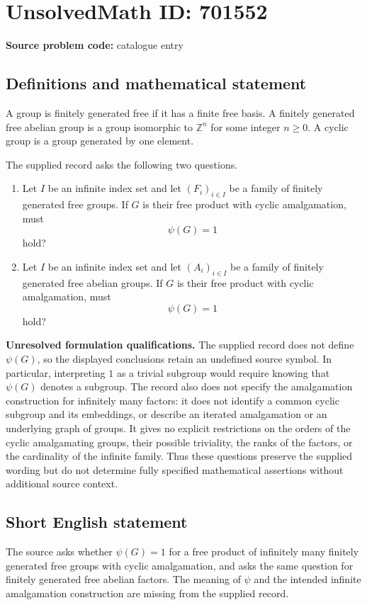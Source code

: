 \documentclass[11pt]{article}
\newcommand{\Z}{\mathbb{Z}}
\begin{document}
\section*{UnsolvedMath ID: 701552}
\textbf{Source problem code:} catalogue entry
\subsection{Definitions and mathematical statement}
A group is finitely generated free if it has a finite free basis. A finitely generated free abelian group is a group isomorphic to \(\Z^n\) for some integer \(n\geq 0\). A cyclic group is a group generated by one element.

The supplied record asks the following two questions.
\begin{enumerate}
\item[(a)] Let \(I\) be an infinite index set and let \((F_i)_{i\in I}\) be a family of finitely generated free groups. If \(G\) is their free product with cyclic amalgamation, must
\[
\psi(G)=1
\]
hold?
\item[(b)] Let \(I\) be an infinite index set and let \((A_i)_{i\in I}\) be a family of finitely generated free abelian groups. If \(G\) is their free product with cyclic amalgamation, must
\[
\psi(G)=1
\]
hold?
\end{enumerate}

\textbf{Unresolved formulation qualifications.} The supplied record does not define \(\psi(G)\), so the displayed conclusions retain an undefined source symbol. In particular, interpreting \(1\) as a trivial subgroup would require knowing that \(\psi(G)\) denotes a subgroup. The record also does not specify the amalgamation construction for infinitely many factors: it does not identify a common cyclic subgroup and its embeddings, or describe an iterated amalgamation or an underlying graph of groups. It gives no explicit restrictions on the orders of the cyclic amalgamating groups, their possible triviality, the ranks of the factors, or the cardinality of the infinite family. Thus these questions preserve the supplied wording but do not determine fully specified mathematical assertions without additional source context.
\subsection{Short English statement}
The source asks whether \(\psi(G)=1\) for a free product of infinitely many finitely generated free groups with cyclic amalgamation, and asks the same question for finitely generated free abelian factors. The meaning of \(\psi\) and the intended infinite amalgamation construction are missing from the supplied record.
\end{document}
